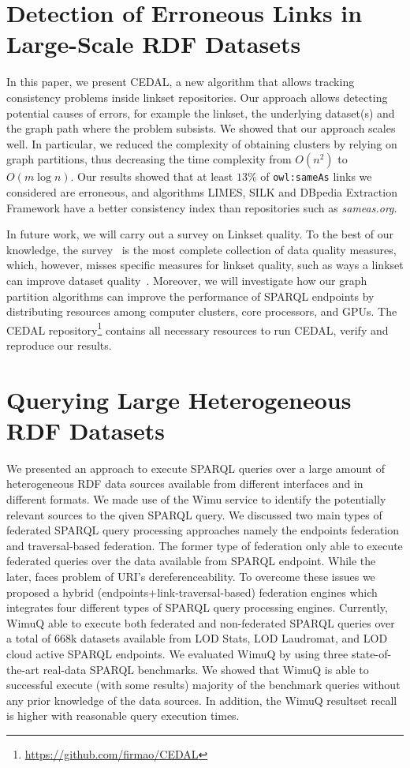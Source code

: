 \section{Detection of Erroneous Links in Large-Scale RDF Datasets}
In this paper, we present CEDAL, a new algorithm that allows tracking consistency problems inside linkset repositories. Our approach allows detecting potential causes of errors, for example the linkset, the underlying dataset(s) and the graph path where the problem subsists.
We showed that our approach scales well. In particular, we reduced the complexity of obtaining clusters by relying on graph partitions, thus decreasing the time complexity from $O(n^2)$ to $O(m \log n)$.
Our results showed that at least $13\%$ of \texttt{owl:sameAs} links we considered are erroneous, and algorithms LIMES, SILK and DBpedia Extraction Framework have a better consistency index than repositories such as \emph{sameas.org}. %

In future work, we will carry out a survey on Linkset quality. To the best of our knowledge, the survey~\cite{zaveri2015quality} is the most complete collection of data quality measures, which, however, misses specific measures for linkset quality, such as ways a linkset can improve dataset quality~\cite{Albertoni:2013:ALQ:2457317.2457327,yaghouti2015metric,casanova2014materialized}.
Moreover, we will investigate how our graph partition algorithms can improve the performance of SPARQL endpoints by distributing resources among computer clusters, core processors, and GPUs.
The CEDAL repository\footnote{\url{https://github.com/firmao/CEDAL}} contains all necessary resources to run CEDAL, verify and reproduce our results.

\section{Querying Large Heterogeneous RDF Datasets}
We presented an approach to execute SPARQL queries over a large amount of heterogeneous RDF data sources available from different interfaces and in different formats. We made use of the Wimu service to identify the potentially relevant sources to the qiven SPARQL query. We discussed two main types of federated SPARQL query processing approaches namely the endpoints federation and traversal-based federation. The former type of federation only able to execute federated queries over the data available from SPARQL endpoint. While the later, faces problem of URI's dereferenceability. To overcome these issues we proposed a hybrid (endpoints+link-traversal-based) federation engines which integrates four different types of SPARQL query processing engines. Currently, WimuQ able to execute both federated and non-federated SPARQL queries over a total of 668k datasets available from LOD Stats, LOD Laudromat, and LOD cloud active SPARQL endpoints. We evaluated WimuQ by using three state-of-the-art real-data SPARQL benchmarks. We showed that WimuQ is able to successful execute (with some results) majority of the benchmark queries without any prior knowledge of the data sources. In addition, the WimuQ resultset recall is higher with reasonable query execution times. 

